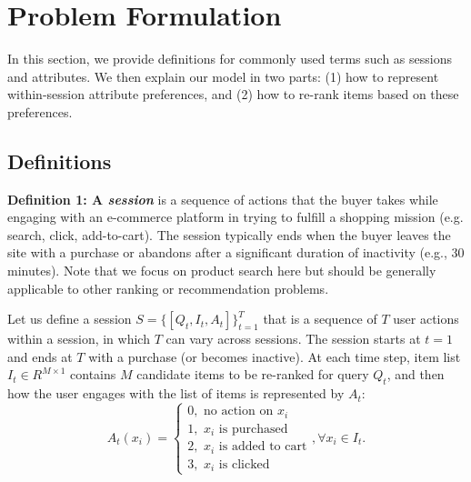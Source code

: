 \documentclass[11pt, dvipdfmx]{article}
\begin{document}
\section{Problem Formulation} \label{sec:problem_formulation}
In this section, we provide definitions for commonly used terms such as sessions and attributes. We then explain our model in two parts: (1) how to represent within-session attribute preferences, and (2) how to re-rank items based on these preferences. 
\subsection{Definitions}
\noindent\textbf{Definition 1: A \textit{session}} is a sequence of  actions that the buyer takes while engaging with an e-commerce platform in trying to fulfill a shopping mission (e.g. search, click, add-to-cart). The session typically ends when the buyer leaves the site with a purchase or abandons after a significant duration of inactivity (e.g., 30 minutes). 
Note that we focus on product search here but should be generally applicable to other ranking or recommendation problems.

Let us define a session $S=\{{[Q_t, I_t, A_t]}\}_{t=1}^T$ that is a sequence of $T$ user actions within a session, in which $T$ can vary across sessions. The session starts at $t=1$ and ends at $T$ with a purchase (or becomes inactive). At each time step, item list $I_t\in R^{M\times 1}$ contains $M$ candidate items to be re-ranked for query $Q_t$, and then how the user engages with the list of items is represented by $A_t$:
\begin{equation}
A_t(x_i)=
\left\{
    \begin{array}{ll}
    0,\,\,\mbox{no action on $x_i$} \\
    1,\,\,x_i\mbox{ is purchased} \\
    2,\,\,x_i\mbox{ is added to cart} \\
    3,\,\,x_i\mbox{ is clicked}
    \end{array}
\right.
, \forall x_i\in I_t.
\label{eq:action_on_item}
\end{equation}
\end{document}
